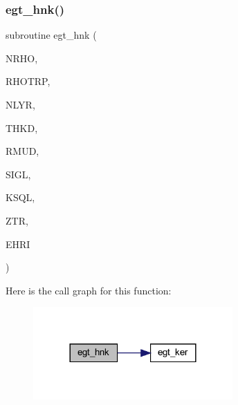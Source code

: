 \subsubsection{\texorpdfstring{egt\+\_\+hnk()}{egt\_hnk()}}
{\footnotesize\ttfamily subroutine egt\+\_\+hnk (\begin{DoxyParamCaption}\item[{integer}]{N\+R\+HO,  }\item[{real, dimension(nrho)}]{R\+H\+O\+T\+RP,  }\item[{integer}]{N\+L\+YR,  }\item[{real(kind=ql), dimension(nlyr)}]{T\+H\+KD,  }\item[{real(kind=ql), dimension(0\+:nlyr)}]{R\+M\+UD,  }\item[{complex(kind=ql), dimension(nlyr)}]{S\+I\+GL,  }\item[{complex(kind=ql), dimension(nlyr)}]{K\+S\+QL,  }\item[{real}]{Z\+TR,  }\item[{complex(kind=ql), dimension(nrho,6)}]{E\+H\+RI }\end{DoxyParamCaption})}

Here is the call graph for this function\+:\nopagebreak
\begin{figure}[H]
\begin{center}
\leavevmode
\includegraphics[width=216pt]{Leroi__c_8f90_ae50e88569c7037d3d431d0b0dd30c795_cgraph}
\end{center}
\end{figure}
\mbox{\label{Leroi__c_8f90_ad8346887f578fa81508d64ff7308bd70}} 
